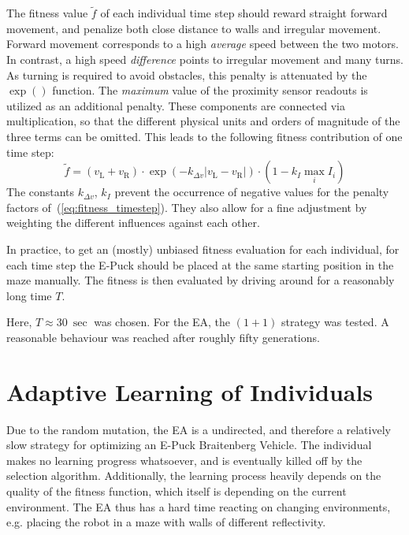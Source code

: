 \documentclass[a4paper]{jacow}
\begin{document}
The fitness value $\tilde{f}$ of each individual time step should reward straight forward movement, and penalize both close distance to walls and irregular movement. Forward movement corresponds to a high \emph{average} speed between the two motors. In contrast, a high speed \emph{difference} points to irregular movement and many turns. As turning is required to avoid obstacles, this penalty is attenuated by the $\exp()$ function. The \emph{maximum} value of the proximity sensor readouts is utilized as an additional penalty. These components are connected via multiplication, so that the different physical units and orders of magnitude of the three terms can be omitted. This leads to the following fitness contribution of one time step:
\begin{equation}
	\tilde{f} = \left( v_\mathrm{L} + v_\mathrm{R} \right) \cdot \exp\left( - k_{\Delta v}|v_\mathrm{L}-v_\mathrm{R}| \right) \cdot \left(1- k_{I} \max\limits_i I_i\right)
	\label{eq:fitness_timestep} 
\end{equation}
The constants $k_{\Delta v}$, $k_I$ prevent the occurrence of negative values for the penalty factors of~(\ref{eq:fitness_timestep}). They also allow for a fine adjustment by weighting the different influences against each other.

In practice, to get an (mostly) unbiased fitness evaluation for each individual, for each time step the E-Puck should be placed at the same starting position in the maze manually. The fitness is then evaluated by driving around for a reasonably long time $T$. 

Here, $T\approx\SI{30}{\sec}$ was chosen. For the EA, the $(1+1)$ strategy was tested. A reasonable behaviour was reached after roughly fifty generations.


\section{Adaptive Learning of Individuals}

Due to the random mutation, the EA is a undirected, and therefore a relatively slow strategy for optimizing an E-Puck Braitenberg Vehicle. The individual makes no learning progress whatsoever, and is eventually killed off by the selection algorithm. Additionally, the learning process heavily depends on the quality of the fitness function, which itself is depending on the current environment. The EA thus has a hard time reacting on changing environments, e.g. placing the robot in a maze with walls of different reflectivity.
\end{document}

